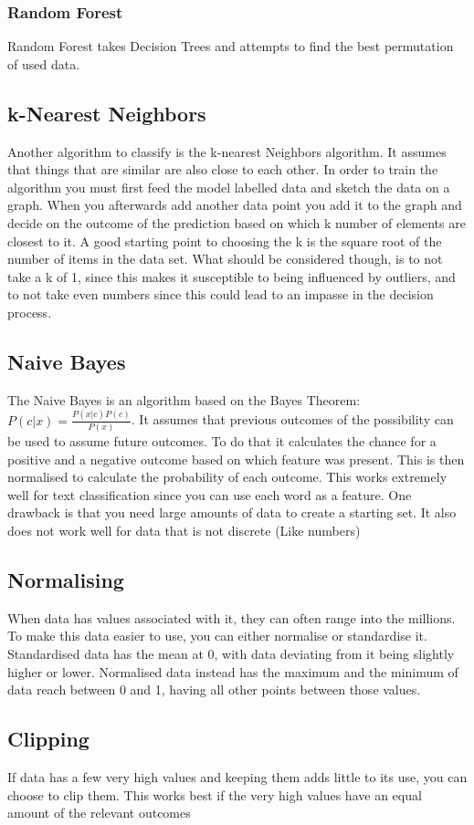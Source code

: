 \documentclass{article}
\begin{document}
	\subsubsection{Random Forest}
	Random Forest takes Decision Trees and attempts to find the best permutation of used data.
	\subsection{k-Nearest Neighbors}
	Another algorithm to classify is the k-nearest Neighbors algorithm. It assumes that things that are similar are also close to each other. In order to train the algorithm you must first feed the model labelled data and sketch the data on a graph. When you afterwards add another data point you add it to the graph and decide on the outcome of the prediction based on which k number of elements are closest to it. A good starting point to choosing the k is the square root of the number of items in the data set. What should be considered though, is to not take a k of 1, since this makes it susceptible to being influenced by outliers, and to not take even numbers since this could lead to an impasse in the decision process.
	\subsection{Naive Bayes}
	The Naive Bayes is an algorithm based on the Bayes Theorem: $P(c|x)=\frac{P(x|c)P(c)}{P(x)}$. It assumes that previous outcomes of the possibility can be used to assume future outcomes. To do that it calculates the chance for a positive and a negative outcome based on which feature was present. This is then normalised to calculate the probability of each outcome. This works extremely well for text classification since you can use each word as a feature. One drawback is that you need large amounts of data to create a starting set. It also does not work well for data that is not discrete (Like numbers)
	\subsection{Normalising}
	When data has values associated with it, they can often range into the millions. To make this data easier to use, you can either normalise or standardise it. Standardised data has the mean at 0, with data deviating from it being slightly higher or lower. Normalised data instead has the maximum and the minimum of data reach between 0 and 1, having all other points between those values. 
	\subsection{Clipping}
	If data has a few very high values and keeping them adds little to its use, you can choose to clip them. This works best if the very high values have an equal amount of the relevant outcomes
\end{document}
